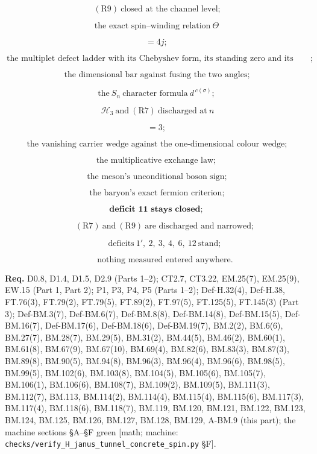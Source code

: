 \documentclass[11pt,openany]{report}
\theoremstyle{canonplain}
\theoremstyle{canondef}
\begin{document}
\[
\ (\mathrm{R9})\ \text{closed at the channel level};
\]

\[
\text{the exact spin--winding relation}\ \Theta
\]

\[
= 4j;
\]

\[
\ \text{the multiplet defect ladder with its Chebyshev form, its standing zero and its ceiling};
\]

\[
\ \text{the dimensional bar against fusing the two angles};
\]

\[
\text{the}\ S_n\ \text{character formula}\ d^{\,c(\sigma)};
\]

\[
\ \mathcal H_3\ \text{and}\ (\mathrm{R7})\ \text{discharged at}\ n
\]

\[
= 3;
\]

\[
\ \text{the vanishing carrier wedge against the one-dimensional colour wedge};
\]

\[
\text{the multiplicative exchange law};
\]

\[
\ \text{the meson's unconditional boson sign};
\]

\[
\ \text{the baryon's exact fermion criterion};
\]

\[
\textbf{deficit 11 stays closed};
\]

\[
\qquad (\mathrm{R7})\ \text{and}\ (\mathrm{R9})\ \text{are discharged and narrowed};
\]

\[
\qquad \text{deficits}\ 1',\ 2,\ 3,\ 4,\ 6,\ 12\ \text{stand};
\]

\[
\qquad \text{nothing measured entered anywhere}.
\]

\textbf{Req.} D0.8, D1.4, D1.5, D2.9 (Parts 1–2); CT2.7, CT3.22, EM.25(7), EM.25(9), EW.15 (Part 1, Part 2); P1, P3, P4, P5 (Parts 1–2); Def-H.32(4), Def-H.38, FT.76(3), FT.79(2), FT.79(5), FT.89(2), FT.97(5), FT.125(5), FT.145(3) (Part 3); Def-BM.3(7), Def-BM.6(7), Def-BM.8(8), Def-BM.14(8), Def-BM.15(5), Def-BM.16(7), Def-BM.17(6), Def-BM.18(6), Def-BM.19(7), BM.2(2), BM.6(6), BM.27(7), BM.28(7), BM.29(5), BM.31(2), BM.44(5), BM.46(2), BM.60(1), BM.61(8), BM.67(9), BM.67(10), BM.69(4), BM.82(6), BM.83(3), BM.87(3), BM.89(8), BM.90(5), BM.94(8), BM.96(3), BM.96(4), BM.96(6), BM.98(5), BM.99(5), BM.102(6), BM.103(8), BM.104(5), BM.105(6), BM.105(7), BM.106(1), BM.106(6), BM.108(7), BM.109(2), BM.109(5), BM.111(3), BM.112(7), BM.113, BM.114(2), BM.114(4), BM.115(4), BM.115(6), BM.117(3), BM.117(4), BM.118(6), BM.118(7), BM.119, BM.120, BM.121, BM.122, BM.123, BM.124, BM.125, BM.126, BM.127, BM.128, BM.129, A-BM.9 (this part); the machine sections §A–§F green [math; machine: \texttt{checks/\allowbreak{}verify\_\allowbreak{}H\_\allowbreak{}janus\_\allowbreak{}tunnel\_\allowbreak{}concrete\_\allowbreak{}spin.py} §F].
\end{document}
